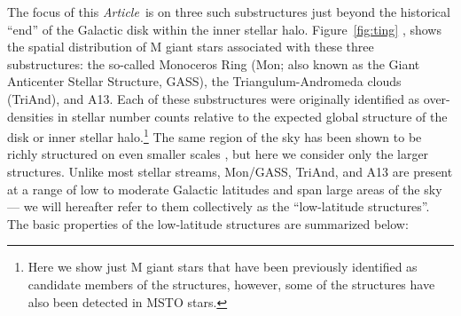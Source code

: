 \documentclass[galaxies,article,submit,moreauthors,pdftex,10pt,a4paper]{mdpi}
\newcommand{\documentname}{\emph{Article}}
\begin{document}
The focus of this \documentname\ is on three such substructures just beyond the
historical ``end'' of the Galactic disk within the inner stellar halo.
Figure~\ref{fig:ting} \cite[reproduced with data from][]{li17}, shows the
spatial distribution of M giant stars associated with these three
substructures: the so-called Monoceros Ring (Mon; also known as the Giant
Anticenter Stellar Structure, GASS), the Triangulum-Andromeda clouds (TriAnd),
and A13.
Each of these substructures were originally identified as over-densities in
stellar number counts relative to the expected global structure of the disk or
inner stellar halo.\footnote{Here we show just M giant stars that have been
previously identified as candidate members of the structures, however, some of
the structures have also been detected in MSTO stars.}
The same region of the sky has been shown to be richly structured on even
smaller scales \cite{slater14,martin14,deason14}, but here we consider only the
larger structures.
Unlike most stellar streams, Mon/GASS, TriAnd, and A13 are present at a range
of low to moderate Galactic latitudes and span large areas of the sky --- we
will hereafter refer to them collectively as the ``low-latitude structures''.
The basic properties of the low-latitude structures are summarized below:
\end{document}
